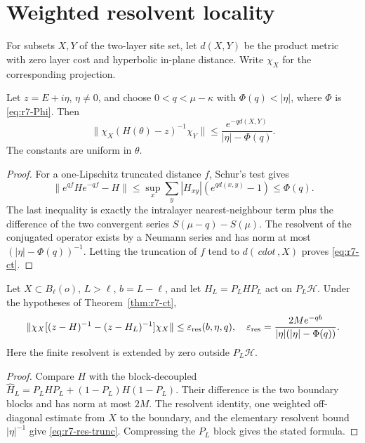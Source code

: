 \section{Weighted resolvent locality}
\label{sec:r7-resolvent}

For subsets $X,Y$ of the two-layer site set, let $d(X,Y)$ be the product
metric with zero layer cost and hyperbolic in-plane distance.  Write $\chi_X$
for the corresponding projection.

\begin{theorem}
\label{thm:r7-ct}
Let $z=E+i\eta$, $\eta\ne0$, and choose
$0<q<\mu-\kappa$ with $\Phi(q)<|\eta|$, where $\Phi$ is
\eqref{eq:r7-Phi}.  Then
\begin{equation}
 \|\chi_X(H(\theta)-z)^{-1}\chi_Y\|
 \le\frac{e^{-qd(X,Y)}}{|\eta|-\Phi(q)}.
 \label{eq:r7-ct}
\end{equation}
The constants are uniform in $\theta$.
\end{theorem}

\begin{proof}
For a one-Lipschitz truncated distance $f$, Schur's test gives
\begin{equation}
 \|e^{qf}He^{-qf}-H\|\le
 \sup_x\sum_y|H_{xy}|(e^{qd(x,y)}-1)\le\Phi(q).
\end{equation}
The last inequality is exactly the intralayer nearest-neighbour term plus
the difference of the two convergent series $S(\mu-q)-S(\mu)$.
The resolvent of the conjugated operator exists by a Neumann series and has
norm at most $(|\eta|-\Phi(q))^{-1}$.  Letting the truncation of $f$ tend to
$d(\,cdot\,,X)$ proves \eqref{eq:r7-ct}.
\end{proof}

\begin{corollary}
\label{cor:r7-res-trunc}
Let $X\subset B_\ell(o)$, $L>\ell$, $b=L-\ell$, and let
$H_L=P_LHP_L$ act on $P_L\mathscr H$.  Under the hypotheses of
Theorem~\ref{thm:r7-ct},
\begin{equation}
 \|\chi_X[(z-H)^{-1}-(z-H_L)^{-1}]\chi_X\|
 \le \varepsilon_{\rm res}(b,\eta,q),
 \quad
 \varepsilon_{\rm res}=
 \frac{2M e^{-qb}}{|\eta|(|\eta|-\Phi(q))}.
 \label{eq:r7-res-trunc}
\end{equation}
Here the finite resolvent is extended by zero outside $P_L\mathscr H$.
\end{corollary}

\begin{proof}
Compare $H$ with the block-decoupled
$\widehat H_L=P_LHP_L+(1-P_L)H(1-P_L)$.  Their difference is the two boundary
blocks and has norm at most $2M$.  The resolvent identity, one weighted
off-diagonal estimate from $X$ to the boundary, and the elementary resolvent
bound $|\eta|^{-1}$ give \eqref{eq:r7-res-trunc}.  Compressing the
$P_L$ block gives the stated formula.
\end{proof}

